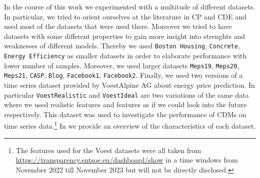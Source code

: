 In the course of this work we experimented with a multitude of different datasets. In particular, we tried to orient ourselves at the literature in CP and CDE \cite{rothfuss2019noise,sesia2021conformal} and used most of the datasets that were used there. Moreover we tried to have datasets with some different properties to gain more insight into strenghts and weaknesses of different models. Thereby we used \texttt{Boston Housing}, \texttt{Concrete}, \texttt{Energy Efficiency} as smaller datasets in order to elaborate performance with lower number of samples. Moreover, we used larger datasets \texttt{Meps19}, \texttt{Meps20}, \texttt{Meps21}, \texttt{CASP}, \texttt{Blog}, \texttt{Facebook1}, \texttt{Facebook2}. Finally, we used two versions of a time series dataset provided by VoestAlpine AG about energy price prediction. In particular \texttt{VoestRealistic} and \texttt{VoestIdeal} are two variations of the same data where we used realistic features and features as if we could look into the future respectively. This dataset was used to investigate the performance of CDMs on time series data.\footnote{The features used for the Voest datasets were all taken from \url{https://transparency.entsoe.eu/dashboard/show} in a time windows from November 2022 till November 2023 but will not be directly disclosed.} In  we provide an overview of the characteristics of each dataset.

